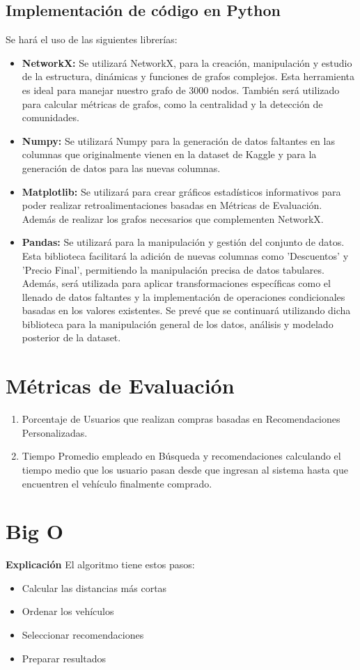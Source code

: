 \documentclass[12pt]{article}
\begin{document}
\subsection{Implementación de código en Python}
Se hará el uso de las siguientes librerías:
\begin{itemize}
    \item \textbf{NetworkX:} Se utilizará NetworkX, para la creación, manipulación y estudio de la estructura, dinámicas y funciones de grafos complejos. Esta herramienta es ideal para manejar nuestro grafo de 3000 nodos. También será utilizado para calcular métricas de grafos, como la centralidad y la detección de comunidades.
    \item \textbf{Numpy:} Se utilizará Numpy para la generación de datos faltantes en las columnas que originalmente vienen en la dataset de Kaggle y para la generación de datos para las nuevas columnas.
    \item \textbf{Matplotlib:} Se utilizará para crear gráficos estadísticos informativos para poder realizar retroalimentaciones basadas en Métricas de Evaluación. Además de realizar los grafos necesarios que complementen NetworkX.
    \item \textbf{Pandas:} Se utilizará para la manipulación y gestión del conjunto de datos. Esta biblioteca facilitará la adición de nuevas columnas como 'Descuentos' y 'Precio Final', permitiendo la manipulación precisa de datos tabulares. Además, será utilizada para aplicar transformaciones específicas como el llenado de datos faltantes y la implementación de operaciones condicionales basadas en los valores existentes. Se prevé que se continuará utilizando dicha biblioteca para la manipulación general de los datos, análisis y modelado posterior de la dataset.
\end{itemize}

\section{Métricas de Evaluación}
\begin{enumerate}
    \item Porcentaje de Usuarios que realizan compras basadas en Recomendaciones Personalizadas.
    \item Tiempo Promedio empleado en Búsqueda y recomendaciones calculando el tiempo medio que los usuario pasan desde que ingresan al sistema hasta que encuentren el vehículo finalmente comprado.
\end{enumerate}
\section{Big O}
\textbf{Explicación}
El algoritmo tiene estos pasos:
\begin{itemize}
    \item Calcular las distancias más cortas
    \item Ordenar los vehículos
    \item Seleccionar recomendaciones
    \item Preparar resultados
\end{itemize}
\end{document}
